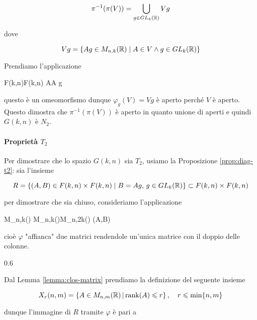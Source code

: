 \begin{equation}
	\pi^{-1}(\pi(V)) = \bigcup_{g \in GL_{k}(\mathbb{R})} V g
\end{equation}

dove

\begin{equation}
	V g = \{ A g \in M_{n,k}(\mathbb{R}) \mid A \in V \wedge g \in GL_{k}(\mathbb{R}) \}
\end{equation}

Prendiamo l'applicazione

	{F(k,n)}{F(k,n)}
	{A}{A g}

questo è un omeomorfismo dunque $ \varphi_{g}(V) = V g $ è aperto perché $ V $ è aperto. Questo dimostra che $ \pi^{-1}(\pi(V)) $ è aperto in quanto unione di aperti e quindi $ G(k,n) $ è $ N_{2} $.

\paragraph{Proprietà $ T_{2} $}

Per dimostrare che lo spazio $ G(k,n) $ sia $ T_{2} $, usiamo la Proposizione \ref{prop:diag-t2}: sia l'insieme

\begin{equation}
	R = \{ (A,B) \in F(k,n) \times F(k,n) \mid B = A g, \, g \in GL_{k}(\mathbb{R}) \} \subset F(k,n) \times F(k,n)
\end{equation}

per dimostrare che sia chiuso, consideriamo l'applicazione

\map{\varphi}
	{M_{n,k}(\R) \times M_{n,k}(\R)}{M_{n,2k}(\R)}
	{(A,B)}{}

cioè $ \varphi $ "affianca" due matrici rendendole un'unica matrice con il doppio delle colonne.

	{0.6}{%
			}

Dal Lemma \ref{lemma:clos-matrix} prendiamo la definizione del seguente insieme

\begin{equation}
	X_{r}(n,m) = \left\{ A \in M_{n,m}(\R) \st \rank(A) \leqslant r \right\} %
	\qcomma r \leqslant \min\{n,m\}
\end{equation}

dunque l'immagine di $ R $ tramite $ \varphi $ è pari a


